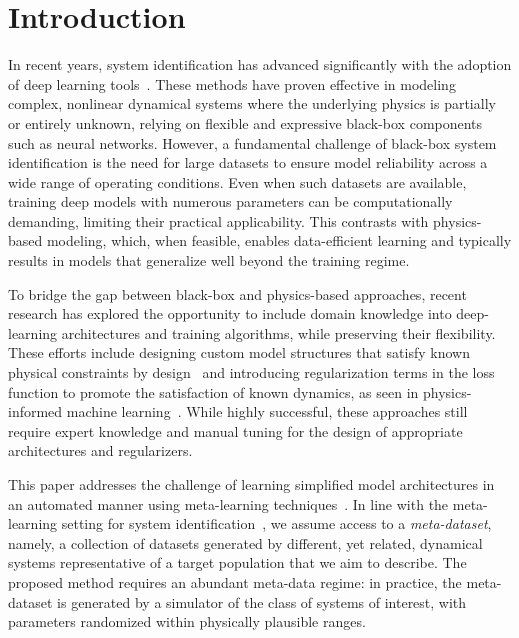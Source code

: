 \documentclass{article}
\begin{document}
\section{Introduction}
In recent years, system identification has advanced significantly with the adoption of deep learning tools~\cite{pillonetto2025deep, deshpande2023physics, Bem25, champneys2024baseline}. These methods have proven  effective in modeling complex, nonlinear dynamical systems where the underlying physics is partially or entirely unknown, relying on flexible and expressive black-box components such as neural networks. However, a fundamental challenge of black-box system identification is the need for large datasets to ensure model reliability across a wide range of operating conditions. Even when such datasets are available, training deep models with numerous parameters can be computationally demanding, limiting their practical applicability. This contrasts with physics-based modeling, which, when feasible, enables data-efficient learning and typically results in models that generalize well beyond the training regime.

To bridge the gap between black-box and physics-based approaches, recent research has explored the opportunity to include domain knowledge into deep-learning architectures and training algorithms, while preserving their flexibility. These efforts include designing custom model structures that satisfy known physical constraints by design~\cite{moradi2023physics, deshpande2023physics, forgione2021continuous} and introducing regularization terms in the loss function to promote the satisfaction of known dynamics, as seen in physics-informed machine learning~\cite{nghiem2023physics}. While highly successful, these approaches still require expert knowledge and manual tuning for the design of appropriate architectures and regularizers.

This paper addresses the challenge of learning simplified model architectures in an automated manner using meta-learning techniques~\cite{hospedales2021meta}. In line with the meta-learning setting for system identification~\cite{forgione2023system,chakrabarty2025meta},
we assume access to a \emph{meta-dataset}, namely, a collection of datasets generated by different, yet related, dynamical systems representative of a target population that we aim to describe. The proposed method requires an abundant meta-data regime: in practice, the meta-dataset is generated by a simulator of the class of
systems of interest, with parameters randomized within physically plausible ranges.
\end{document}
